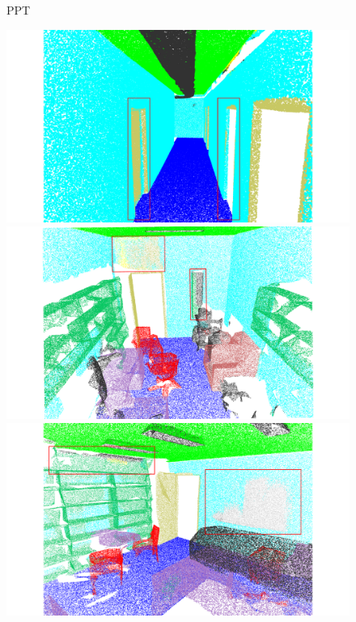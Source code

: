 \begin{figure}[htbp]
    \begin{minipage}{0.1\textwidth}
        \centering
        PPT
    \end{minipage}
    \hfill
    \begin{minipage}{0.22\textwidth}
        \centering
        \includegraphics[width=\textwidth]{fig/supplement/semantic_segmentation/hallway_10/PPT_hallway_10.pdf}
    \end{minipage}
    \hfill
    \begin{minipage}{0.22\textwidth}
        \centering
        \includegraphics[width=\textwidth]{fig/supplement/semantic_segmentation/office_9/PPT_office_9.pdf}
    \end{minipage}
    \hfill
    \begin{minipage}{0.22\textwidth}
        \centering
        \includegraphics[width=\textwidth]{fig/supplement/semantic_segmentation/office_35/PPT_office_35.pdf}

\end{minipage}
\end{figure}
